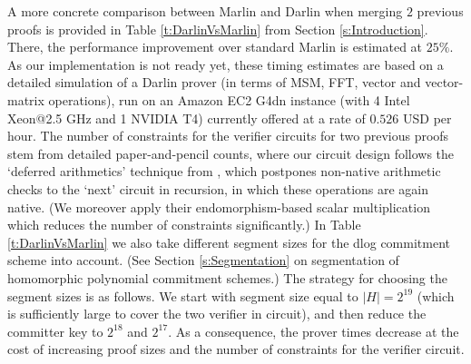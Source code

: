 \documentclass[10pt,article,oneside]{memoir}
\theoremstyle{definition}
\theoremstyle{remark}
\begin{document}
A more concrete comparison between Marlin and Darlin when merging $2$ previous proofs is provided in Table \ref{t:DarlinVsMarlin} from Section \ref{s:Introduction}.
There, the performance improvement over standard Marlin is estimated at $25\%$.
As our implementation is not ready yet, these timing estimates are based on a detailed simulation of a Darlin prover (in terms of MSM, FFT, vector and vector-matrix operations), run on an Amazon EC2 G4dn instance (with 4 Intel Xeon@2.5 GHz and 1 NVIDIA T4) currently offered at a rate of $0.526$ USD per hour.
The number of constraints for the verifier circuits for two previous proofs stem from detailed paper-and-pencil counts, where our circuit design follows the `deferred arithmetics' technique from \cite{Halo}, which postpones non-native arithmetic checks to the `next' circuit in recursion, in which these operations are again native. (We moreover apply their endomorphism-based scalar multiplication which reduces the number of constraints significantly.)
In Table \ref{t:DarlinVsMarlin} we also take different segment sizes for the dlog commitment scheme into account. (See Section \ref{s:Segmentation} on segmentation of homomorphic polynomial commitment schemes.)
The strategy for choosing the segment sizes is as follows.
We start with segment size equal to $|H|=2^{19}$ (which is sufficiently large to cover the two verifier in circuit), and then reduce the committer key to $2^{18}$ and $2^{17}$.
As a consequence, the prover times decrease at the cost of increasing proof sizes and the number of constraints for the verifier circuit.

\end{document}
